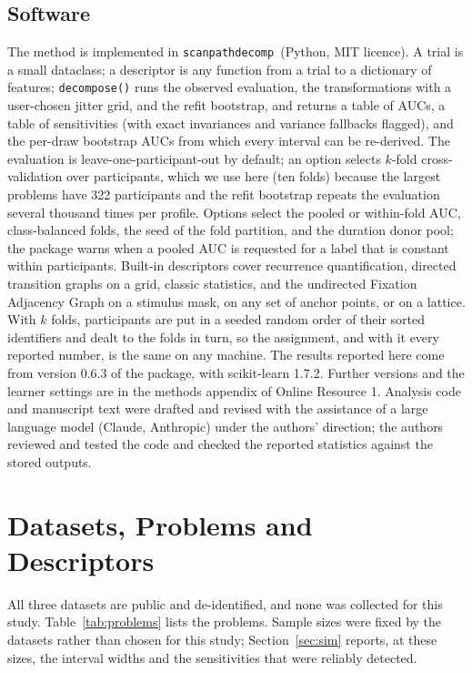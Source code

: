 \documentclass[man,floatsintext,12pt]{apa7}
\newcommand{\pkg}{\texttt{scanpathdecomp}}
\begin{document}
\subsection{Software}
The method is implemented in \pkg\ (Python, MIT licence). A trial is a small dataclass; a descriptor is any function from a trial to a dictionary of features; \texttt{decompose()} runs the observed evaluation, the transformations with a user-chosen jitter grid, and the refit bootstrap, and returns a table of AUCs, a table of sensitivities (with exact invariances and variance fallbacks flagged), and the per-draw bootstrap AUCs from which every interval can be re-derived. The evaluation is leave-one-participant-out by default; an option selects $k$-fold cross-validation over participants, which we use here (ten folds) because the largest problems have 322 participants and the refit bootstrap repeats the evaluation several thousand times per profile. Options select the pooled or within-fold AUC, class-balanced folds, the seed of the fold partition, and the duration donor pool; the package warns when a pooled AUC is requested for a label that is constant within participants. Built-in descriptors cover recurrence quantification, directed transition graphs on a grid, classic statistics, and the undirected Fixation Adjacency Graph on a stimulus mask, on any set of anchor points, or on a lattice. With $k$ folds, participants are put in a seeded random order of their sorted identifiers and dealt to the folds in turn, so the assignment, and with it every reported number, is the same on any machine. The results reported here come from version 0.6.3 of the package, with scikit-learn 1.7.2. Further versions and the learner settings are in the methods appendix of Online Resource 1. Analysis code and manuscript text were drafted and revised with the assistance of a large language model (Claude, Anthropic) under the authors' direction; the authors reviewed and tested the code and checked the reported statistics against the stored outputs.



\section{Datasets, Problems and Descriptors}\label{sec:data}
All three datasets are public and de-identified, and none was collected for this study. Table~\ref{tab:problems} lists the problems. Sample sizes were fixed by the datasets rather than chosen for this study; Section~\ref{sec:sim} reports, at these sizes, the interval widths and the sensitivities that were reliably detected.
\end{document}
